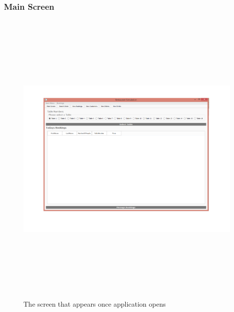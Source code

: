 \begin{landscape}

\subsubsection{Main Screen}

\begin{figure}[H]
    \includegraphics[height = 15cm]{./Maintenance/images/screen1}
    \caption{The screen that appears once application opens} \label{fig:screen1}
\end{figure}


\end{landscape}
